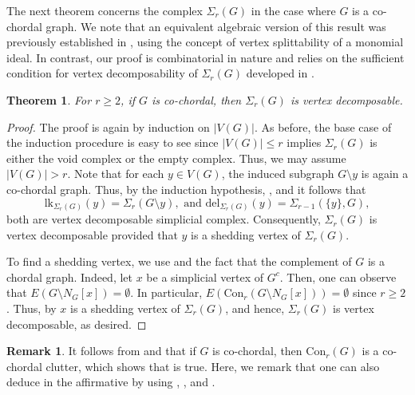 \documentclass[12pt,reqno]{amsart}
\newtheorem{theorem}[proposition]{Theorem}
\theoremstyle{definition}
\newtheorem{remark}[proposition]{Remark}
\newcommand{\lk}{{\mathrm{lk}}}
\newcommand{\del}{{\mathrm{del}}}
\newcommand{\Con}{{\mathrm{Con}}}
\def\del{\mathrm{del}}
\begin{document}
	The next theorem concerns the complex $\Sigma_r(G)$ in the case where $G$ is a co-chordal graph. We note that an equivalent algebraic version of this result was previously established in \cite[Theorem 3.12]{FVDH}, using the concept of vertex splittability of a monomial ideal. In contrast, our proof is combinatorial in nature and relies on the sufficient condition for vertex decomposability of $\Sigma_r(G)$ developed in . 

    
    
	\begin{theorem}\label{V.D of Sigma_r(G) if G is co-chordal}
		For $r\geq 2$, if $G$ is co-chordal, then $\Sigma_r(G)$ is vertex decomposable. 
	\end{theorem}
	\begin{proof}
		The proof is again by induction on $|V(G)|$. As before, the base case of the induction procedure is easy to see since $|V(G)| \leq r $ implies $\Sigma_r(G) $ is either the void complex or the empty complex. Thus, we may assume $|V(G)|>r$. Note that for each $y\in V(G)$, the induced subgraph $G\setminus y$ is again a co-chordal graph. Thus, by the induction hypothesis, , and  it follows that 
        \[
        \lk_{\Sigma_{r}(G)}(y)=\Sigma_r(G\setminus y), \text{ and } \del_{\Sigma_{r}(G)}(y)=\Sigma_{r-1}(\{y\},G),\] both are vertex decomposable simplicial complex. Consequently, $\Sigma_r(G)$ is vertex decomposable provided that $y$ is a shedding vertex of $\Sigma_r(G)$.
		
		To find a shedding vertex, we use  and the fact that the complement of $G$ is a chordal graph. Indeed, let $x$ be a simplicial vertex of $G^c$. Then, one can observe that $E(G\setminus N_G[x])=\emptyset$. In particular, $E(\Con_r(G\setminus N_G[x])) = \emptyset$ since $r\ge 2$. Thus, by  $x$ is a shedding vertex of $\Sigma_r(G)$, and hence, $\Sigma_r(G)$ is vertex decomposable, as desired.
	\end{proof}
\begin{remark}\label{coChordal123}
    It follows from  and  that if $G$ is co-chordal, then $\Con_r(G)$ is a co-chordal clutter, which shows that \cite[Conjecture 6.1]{FVDH} is true. Here, we remark that one can also deduce \cite[Conjecture 6.1]{FVDH} in the affirmative by using \cite[Theorem 3.12]{FVDH}, \cite[Theorem 2.3]{MoradiAhang2016}, and .
\end{remark}
    
\end{document}
